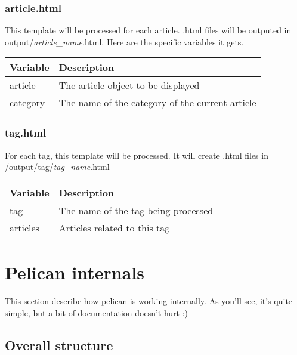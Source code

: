\documentclass[letterpaper,10pt,english]{manual}
\begin{document}
\subsubsection{article.html}

This template will be processed for each article. .html files will be outputed
in output/\emph{article\_name}.html. Here are the specific variables it gets.

\begin{tabulary}{\textwidth}{|L|L|}
\hline
\textbf{
Variable
} & \textbf{
Description
}\\
\hline

article
 & 
The article object to be displayed
\\

category
 & 
The name of the category of the current article
\\
\hline
\end{tabulary}



\subsubsection{tag.html}

For each tag, this template will be processed. It will create .html files in
/output/tag/\emph{tag\_name}.html

\begin{tabulary}{\textwidth}{|L|L|}
\hline
\textbf{
Variable
} & \textbf{
Description
}\\
\hline

tag
 & 
The name of the tag being processed
\\

articles
 & 
Articles related to this tag
\\
\hline
\end{tabulary}


\resetcurrentobjects
\hypertarget{--doc-internals}{}

\section{Pelican internals}

This section describe how pelican is working internally. As you'll see, it's
quite simple, but a bit of documentation doesn't hurt :)


\subsection{Overall structure}
\end{document}
